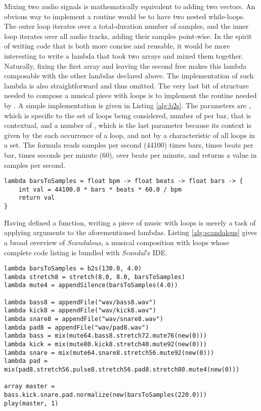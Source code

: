 Mixing two audio signals is mathematically equivalent to adding two vectors. An obvious way to implement a  routine would be to have two nested while-loops. The outer loop iterates over a total-duration number of samples, and the inner loop iterates over all audio tracks, adding their samples point-wise. In the spirit of writing code that is both more concise and reusable, it would be more interesting to write a lambda that took two arrays and mixed them together. Naturally, fixing the first array and leaving the second free makes this lambda composable with the other lambdas declared above. The implementation of such  lambda is also straightforward and thus omitted. The very last bit of structure needed to compose a musical piece with loops is to implement the  routine needed by . A simple implementation is given in Listing \ref{alg:b2s}. The parameters are , which is specific to the set of loops being considered, number of  per bar, that is contextual, and a number of , which is the last parameter because its context is given by the each occurrence of a loop, and not by a characteristic of all loops in a set. The formula reads samples per second (44100) times bars, times beats per bar, times seconds per minute (60), over beats per minute, and returns a value in samples per second.

\begin{lstlisting}[emph={lambda,string,array,read,int,size,new,while,return},emphstyle={\textbf},caption={Converting bars to samples.},label={alg:b2s}]
lambda barsToSamples = float bpm -> float beats -> float bars -> {
	int val = 44100.0 * bars * beats * 60.0 / bpm
	return val
}
\end{lstlisting}

Having defined a  function, writing a piece of music with loops is merely a task of applying arguments to the aforementioned lambdas. Listing \ref{alg:scandalous} gives a broad overview of \emph{Scandalous}, a musical composition with loops whose complete code listing is bundled with \emph{Scandal}'s IDE.

\begin{lstlisting}[emph={lambda,new,array,play},emphstyle={\textbf},caption={The high-level structure of a composition with loops.},label={alg:scandalous}]
lambda barsToSamples = b2s(130.0, 4.0)
lambda stretch8 = stretch(8.0, 8.0, barsToSamples)
lambda mute4 = appendSilence(barsToSamples(4.0))

lambda bass8 = appendFile("wav/bass8.wav")
lambda kick8 = appendFile("wav/kick8.wav")
lambda snare8 = appendFile("wav/snare8.wav")
lambda pad8 = appendFile("wav/pad8.wav")
lambda bass = mix(mute64.bass8.stretch72.mute76(new(0)))
lambda kick = mix(mute80.kick8.stretch40.mute92(new(0)))
lambda snare = mix(mute64.snare8.stretch56.mute92(new(0)))
lambda pad = mix(pad8.stretch56.pulse8.stretch56.pad8.stretch80.mute4(new(0)))

array master = bass.kick.snare.pad.normalize(new(barsToSamples(220.0)))
play(master, 1)
\end{lstlisting}


